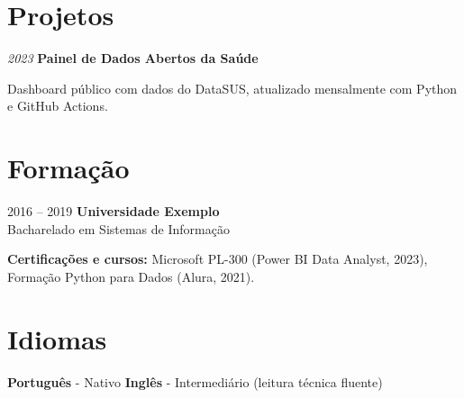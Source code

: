     \section{Projetos}
        \begin{twocolentry}{
            \textit{2023}
        }
            \textbf{Painel de Dados Abertos da Saúde}
        \end{twocolentry}
        \vspace{0.10cm}
        \begin{onecolentry}
            \begin{highlights}
                \item Dashboard público com dados do DataSUS, atualizado mensalmente com Python e GitHub Actions.
            \end{highlights}
        \end{onecolentry}

    \section{Formação}
        \begin{twocolentry}{2016 -- 2019}
            \textbf{Universidade Exemplo} \\
            Bacharelado em Sistemas de Informação
        \end{twocolentry}

        \vspace{0.12cm}

        \begin{onecolentry}
            \textbf{Certificações e cursos:} Microsoft PL-300 (Power BI Data Analyst, 2023), Formação Python para Dados (Alura, 2021).
        \end{onecolentry}

    \section{Idiomas}
        \begin{onecolentry}
            \textbf{Português} - Nativo \quad\textbar\quad \textbf{Inglês} - Intermediário (leitura técnica fluente)
        \end{onecolentry}

